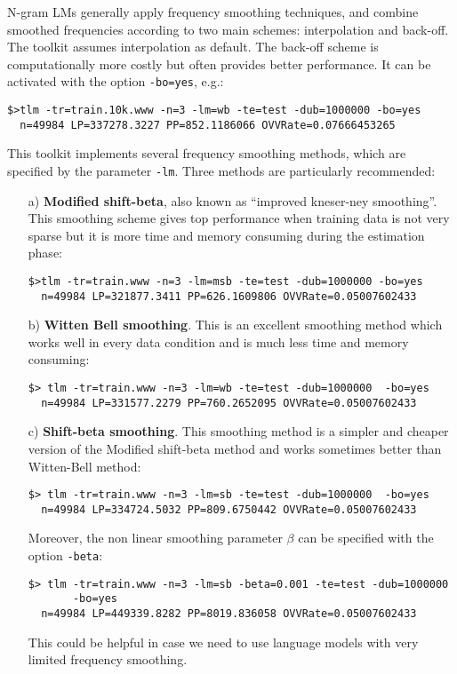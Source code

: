 \documentclass[11pt]{article}
\begin{document}
\noindent
N-gram LMs generally apply frequency smoothing techniques, and combine
smoothed frequencies according to  two main schemes: interpolation and
back-off.  The  toolkit assumes interpolation
as default.  The back-off  scheme is computationally more costly but
often provides better performance. It  can be activated with the option
{\tt -bo=yes}, e.g.:

\begin{verbatim}
$>tlm -tr=train.10k.www -n=3 -lm=wb -te=test -dub=1000000 -bo=yes
  n=49984 LP=337278.3227 PP=852.1186066 OVVRate=0.07666453265
\end{verbatim}


\noindent
This toolkit implements several frequency smoothing methods, which are
specified  by  the  parameter  {\tt -lm}.  Three  methods  are  particularly
recommended:
\begin{itemize}
\item [a)] {\bf Modified shift-beta}, also known as  ``improved kneser-ney smoothing''.  
This smoothing scheme gives top performance when training data is not 
very sparse but it is more time and memory consuming during the estimation phase: 

\begin{verbatim}
$>tlm -tr=train.www -n=3 -lm=msb -te=test -dub=1000000 -bo=yes
  n=49984 LP=321877.3411 PP=626.1609806 OVVRate=0.05007602433
\end{verbatim}


\item [b)] {\bf Witten Bell smoothing}. This is an excellent smoothing
   method which works well in every data condition and is much less time and memory consuming:

\begin{verbatim}
$> tlm -tr=train.www -n=3 -lm=wb -te=test -dub=1000000  -bo=yes
  n=49984 LP=331577.2279 PP=760.2652095 OVVRate=0.05007602433
\end{verbatim}

\item [c)] {\bf Shift-beta smoothing}. This smoothing method is a simpler and cheaper version
of the Modified shift-beta method and works sometimes better than Witten-Bell method: 

\begin{verbatim}
$> tlm -tr=train.www -n=3 -lm=sb -te=test -dub=1000000  -bo=yes
  n=49984 LP=334724.5032 PP=809.6750442 OVVRate=0.05007602433
\end{verbatim}

\noindent
Moreover, the non linear smoothing parameter $\beta$ can be specified with the option {\tt -beta}:
\begin{verbatim}
$> tlm -tr=train.www -n=3 -lm=sb -beta=0.001 -te=test -dub=1000000  
       -bo=yes
  n=49984 LP=449339.8282 PP=8019.836058 OVVRate=0.05007602433
\end{verbatim}
This could be helpful in case we need to use language models with very limited frequency smoothing.

\end{itemize}
\end{document}
